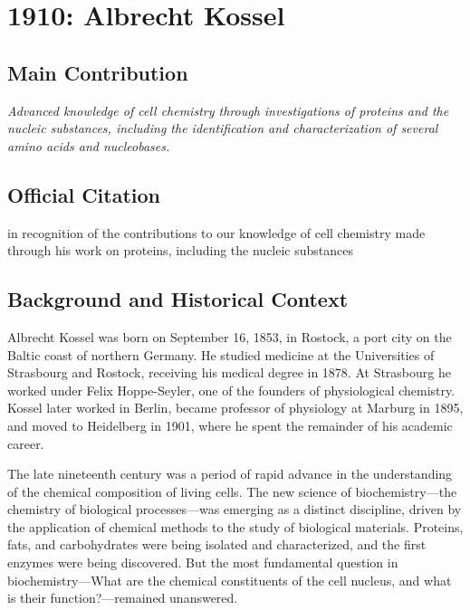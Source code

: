 \chapter[1910 --- Kossel]{1910: Albrecht Kossel}
\label{ch:1910_albrechtkossel}

\section*{Main Contribution}

\textit{Advanced knowledge of cell chemistry through investigations of proteins and the nucleic substances, including the identification and characterization of several amino acids and nucleobases.}\cite{nobel-1910,lecture-1910}

\section{Official Citation}

in recognition of the contributions to our knowledge of cell chemistry made through his work on proteins, including the nucleic substances

\section{Background and Historical Context}

Albrecht Kossel was born on September 16, 1853, in Rostock, a port city on the Baltic coast of northern Germany. He studied medicine at the Universities of Strasbourg and Rostock, receiving his medical degree in 1878. At Strasbourg he worked under Felix Hoppe-Seyler, one of the founders of physiological chemistry. Kossel later worked in Berlin, became professor of physiology at Marburg in 1895, and moved to Heidelberg in 1901, where he spent the remainder of his academic career.\cite{kossel-biographical}

The late nineteenth century was a period of rapid advance in the understanding of the chemical composition of living cells. The new science of biochemistry---the chemistry of biological processes---was emerging as a distinct discipline, driven by the application of chemical methods to the study of biological materials. Proteins, fats, and carbohydrates were being isolated and characterized, and the first enzymes were being discovered. But the most fundamental question in biochemistry---What are the chemical constituents of the cell nucleus, and what is their function?---remained unanswered.

